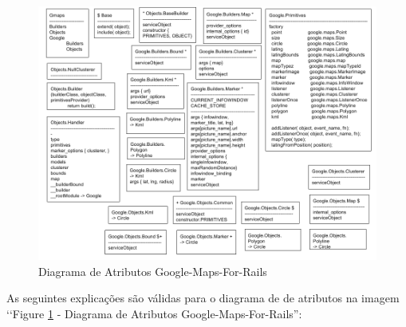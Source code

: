 \begin{figure}[ht]
  \includegraphics[scale=0.48]{images/diagrama_de_atributos_google_maps_for_rails.png}
  \caption{Diagrama de Atributos Google-Maps-For-Rails}
  \label{fig:diagrama_de_atributos_google_maps_for_rails}
\end{figure}

As seguintes explicações são válidas para o diagrama de de atributos na imagem ‘‘Figure 
\ref{fig:diagrama_de_atributos_google_maps_for_rails} - Diagrama de Atributos Google-Maps-For-Rails'':

